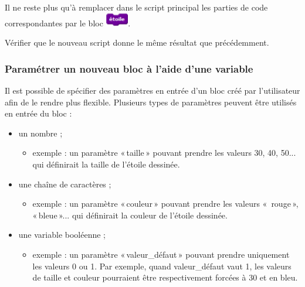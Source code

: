 Il ne reste plus qu’à remplacer dans le script principal les parties de code correspondantes par le bloc  \includegraphics[width=1cm]{./images/scratch03/fonction/Scratch_Fonctions_08}. 

Vérifier que le nouveau script donne le même résultat que précédemment.


\subsubsection{Paramétrer un nouveau bloc à l’aide d’une variable}

Il est possible de spécifier des paramètres en entrée d’un bloc créé par l’utilisateur afin de le rendre plus flexible. Plusieurs types de paramètres peuvent être utilisés en entrée du bloc :

\begin{itemize}
\item un nombre ;
  \begin{itemize}
   \item exemple : un paramètre «\,taille\,» pouvant prendre les valeurs 30, 40, 50... qui définirait la taille de l’étoile dessinée.
  \end{itemize}
\item une chaîne de caractères ;
  \begin{itemize}
     \item exemple : un paramètre «\,couleur\,» pouvant prendre les valeurs «\, rouge\,», «\,bleue\,»... qui définirait la couleur de l’étoile dessinée.
  \end{itemize}
\item une variable booléenne ;
  \begin{itemize}
    \item exemple : un paramètre «\,valeur\_défaut\,» pouvant prendre uniquement les valeurs 0 ou 1. Par exemple, quand valeur\_défaut vaut 1, les valeurs de taille et couleur pourraient être respectivement forcées à 30 et en bleu.
  \end{itemize}
\end{itemize}

